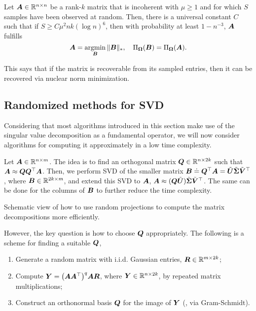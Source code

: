 \begin{theorem}
    Let $\bm{A} \in \mathbb{R}^{n \times n}$ be a rank-$k$ matrix that is incoherent with $\mu \geq 1$ and
    for which $S$ samples have been observed at random. Then, there is a universal constant $C$ such
    that if $S \geq C \mu^2 nk (\log n)^6$, then with probability at least $1 - n^{-3}$, $\bm{A}$
    fulfills \[
        \bm{A} = \operatorname*{argmin}_{\bm{B}} \| \bm{B} \|_*, \quad \Pi_{\bm{\Omega}}(\bm{B}) = \Pi_{\bm{\Omega}}(\bm{A}).
    \]
\end{theorem}

This says that if the matrix is recoverable from its sampled entries, then it can be recovered via
nuclear norm minimization.

\subsection{Randomized methods for SVD}

Considering that most algorithms introduced in this section make use of the singular value
decomposition as a fundamental operator, we will now consider algorithms for computing it
approximately in a low time complexity.

Let $\bm{A} \in \mathbb{R}^{n \times m}$. The idea is to find an orthogonal matrix $\bm{Q} \in \mathbb{R}^{n
        \times 2k}$ such that $\bm{A} \approx \bm{Q} \bm{Q}^\top \bm{A}$. Then, we perform SVD
of the smaller matrix $\bm{B} \doteq \bm{Q}^\top \bm{A} = \tilde{\bm{U}}
    \tilde{\bm{\Sigma}} \tilde{\bm{V}}^\top$, where $\bm{B} \in \mathbb{R}^{2k\times m}$, and extend
this SVD to $\bm{A}$, $\bm{A} \approx (\bm{Q} \tilde{\bm{U}}) \tilde{\bm{\Sigma}}
    \tilde{\bm{V}}^\top$. The same can be done for the columns of $\bm{B}$ to further reduce
the time complexity.

\begin{marginfigure}
    \centering
    \caption{Schematic view of how to use random projections to compute the matrix decompositions more efficiently.}
    \label{fig:random-svd}
\end{marginfigure}

However, the key question is how to choose $\bm{Q}$ appropriately. The following is a scheme for
finding a suitable $\bm{Q}$,
\begin{enumerate}
    \item Generate a random matrix with i.i.d. Gaussian entries, $\bm{R} \in \mathbb{R}^{m \times 2k}$;
    \item Compute $\mat{Y} = \lft( \mat{A}\transpose{\mat{A}} \rgt)^q \mat{A} \mat{R}$, where $\bm{Y} \in
              \mathbb{R}^{n \times 2k}$, by repeated matrix multiplications;
    \item Construct an orthonormal basis $\bm{Q}$ for the image of $\bm{Y}$ (\eg, via Gram-Schmidt).
\end{enumerate}
